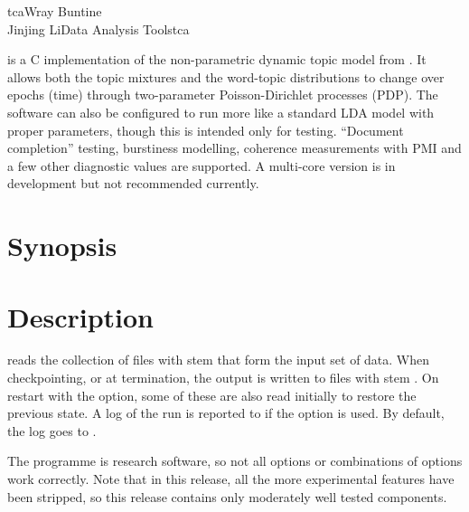 \documentclass[a4paper,english]{article}
\begin{document}
\begin{Name}{1}{tca}{Wray Buntine \\ Jinjing Li}{Data Analysis Tools}{tca}

   is a C implementation of the non-parametric dynamic topic model from \citet{dtmpypwl}. It allows both the topic mixtures and the word-topic distributions to change over epochs (time) through two-parameter Poisson-Dirichlet processes (PDP). The software can also be configured to run more like a standard LDA model with proper parameters, though this is intended only for testing. ``Document completion'' testing, burstiness modelling, coherence measurements with PMI  and a few other diagnostic values are supported.  A multi-core version is in development but not recommended currently.

\end{Name}

\section{Synopsis}

  
                  

\section{Description}
 reads the collection of files with stem
 that form the input set of data.
When checkpointing, or at termination, the output is written
to files with stem  .
On restart with the  option, some of these
are also read initially to restore the previous state.
A log of the run is reported to  if the
 option is used.  By default, the log goes to
.

The programme is research software, so not all options
or combinations of options work correctly.
Note that in this release, all the more experimental features
have been stripped, so this release contains
only moderately well tested components.
\end{document}
